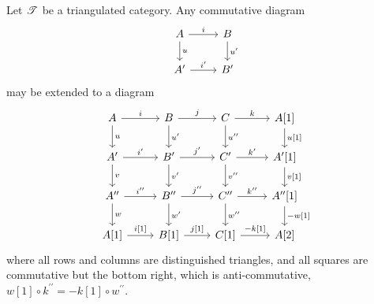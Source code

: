 \documentclass[dissertation.tex]{subfiles}
\begin{document}
\begin{prop}
  Let $\mathscr{T}$ be a triangulated category.
  Any commutative diagram
  $$\begin{tikzcd}
    A \arrow{r}{i}\arrow{d}{u}& B\arrow{d}{u^\prime}\\
    A^\prime \arrow{r}{i^\prime}& B^\prime
  \end{tikzcd}$$
  may be extended to a diagram
  $$\begin{tikzcd}
    A \arrow{r}{i}\arrow{d}{u}& B\arrow{d}{u^\prime}\arrow{r}{j} & C \arrow{r}{k}\arrow{d}{u^{\prime\prime}} & A[1]\arrow{d}{u[1]}\\
    A^\prime \arrow{r}{i^\prime}\arrow{d}{v}& B^\prime\arrow{r}{j^\prime}\arrow{d}{v^\prime} & C^\prime \arrow{r}{k^\prime}\arrow{d}{v^{\prime\prime}} & A^\prime[1]\arrow{d}{v[1]}\\
    A^{\prime\prime} \arrow{r}{i^{\prime\prime}}\arrow{d}{w} & B^{\prime\prime} \arrow{r}{j^{\prime\prime}}\arrow{d}{w^\prime} & C^{\prime\prime} \arrow{r}{k^{\prime\prime}}\arrow{d}{w^{\prime\prime}} & A^{\prime\prime}[1]\arrow{d}{-w[1]}\\
    A[1] \arrow{r}{i[1]} & B[1] \arrow{r}{j[1]} & C[1] \arrow{r}{-k[1]} & A[2]
  \end{tikzcd}$$
  where all rows and columns are distinguished triangles, and all squares are commutative but the bottom right, which is anti-commutative,
  $w[1] \circ k^{\prime\prime} = - k[1] \circ w^{\prime\prime}$.
  

\end{prop}
\end{document}
